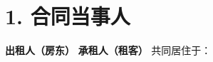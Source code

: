 \section*{1. 合同当事人}
\textbf{出租人（房东）}
\ContractLandlordsZHCN
\vspace{0.5cm}
\textbf{承租人（租客）}
\ContractTenantsZHCN
共同居住于：\Propaddress
